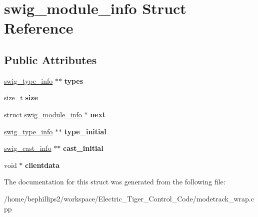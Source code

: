 \hypertarget{structswig__module__info}{\section{swig\-\_\-module\-\_\-info Struct Reference}
\label{structswig__module__info}
}
\subsection*{Public Attributes}
\begin{DoxyCompactItemize}
\item 
\hypertarget{structswig__module__info_ad658c7738e9a035ef8eea865322fbf13}{\hyperlink{structswig__type__info}{swig\-\_\-type\-\_\-info} $\ast$$\ast$ {\bfseries types}}\label{structswig__module__info_ad658c7738e9a035ef8eea865322fbf13}

\item 
\hypertarget{structswig__module__info_aaf8907cf8509ee0464af8c9dfd909042}{size\-\_\-t {\bfseries size}}\label{structswig__module__info_aaf8907cf8509ee0464af8c9dfd909042}

\item 
\hypertarget{structswig__module__info_ac177d150b85ab77122089acf1f06d9c6}{struct \hyperlink{structswig__module__info}{swig\-\_\-module\-\_\-info} $\ast$ {\bfseries next}}\label{structswig__module__info_ac177d150b85ab77122089acf1f06d9c6}

\item 
\hypertarget{structswig__module__info_a76c7d5b0fc10371748616d0b6c815a17}{\hyperlink{structswig__type__info}{swig\-\_\-type\-\_\-info} $\ast$$\ast$ {\bfseries type\-\_\-initial}}\label{structswig__module__info_a76c7d5b0fc10371748616d0b6c815a17}

\item 
\hypertarget{structswig__module__info_a15f6b50a41f144afb1148fc412dc01f7}{\hyperlink{structswig__cast__info}{swig\-\_\-cast\-\_\-info} $\ast$$\ast$ {\bfseries cast\-\_\-initial}}\label{structswig__module__info_a15f6b50a41f144afb1148fc412dc01f7}

\item 
\hypertarget{structswig__module__info_a9fb6e461fcaf14c209049adfae4e9754}{void $\ast$ {\bfseries clientdata}}\label{structswig__module__info_a9fb6e461fcaf14c209049adfae4e9754}

\end{DoxyCompactItemize}


The documentation for this struct was generated from the following file\-:\begin{DoxyCompactItemize}
\item 
/home/bephillips2/workspace/\-Electric\-\_\-\-Tiger\-\_\-\-Control\-\_\-\-Code/modetrack\-\_\-wrap.\-cpp\end{DoxyCompactItemize}
